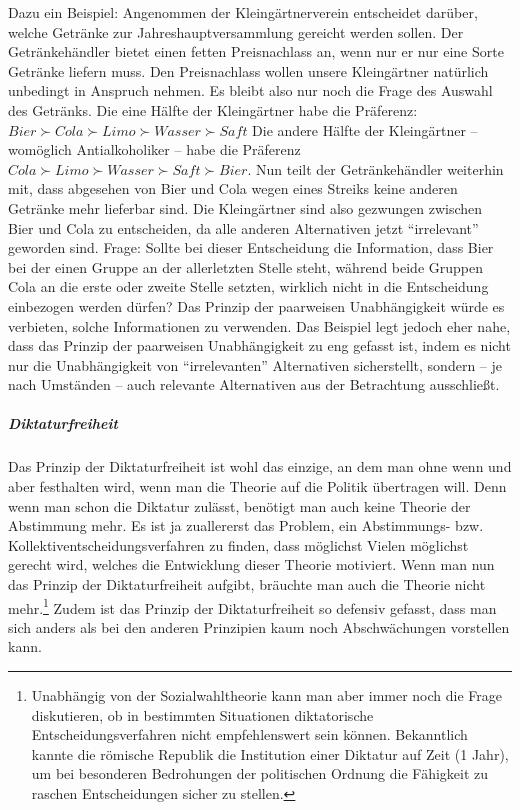 Dazu ein Beispiel: Angenommen der Kleingärtnerverein entscheidet darüber, welche
Getränke zur Jahreshauptversammlung gereicht werden sollen. Der Getränkehändler
bietet einen fetten Preisnachlass an, wenn nur er nur eine Sorte Getränke liefern
muss. Den Preisnachlass wollen unsere Kleingärtner natürlich unbedingt in
Anspruch nehmen. Es bleibt also nur noch die Frage des Auswahl des Getränks. Die
eine Hälfte der Kleingärtner habe die Präferenz: $Bier \succ Cola \succ Limo
\succ Wasser \succ Saft$ Die andere Hälfte der Kleingärtner -- womöglich
Antialkoholiker -- habe die Präferenz $Cola \succ Limo \succ Wasser \succ Saft
\succ Bier$. Nun teilt der Getränkehändler weiterhin mit, dass abgesehen von
Bier und Cola wegen eines Streiks keine anderen Getränke mehr lieferbar sind.
Die Kleingärtner sind also gezwungen zwischen Bier und Cola zu entscheiden, da
alle anderen Alternativen jetzt "`irrelevant"' geworden sind. Frage: Sollte bei
dieser Entscheidung die Information, dass Bier bei der einen Gruppe an der
allerletzten Stelle steht, während beide Gruppen Cola an die erste oder zweite
Stelle setzten, wirklich nicht in die Entscheidung einbezogen werden dürfen?
Das Prinzip der paarweisen Unabhängigkeit würde es verbieten, solche
Informationen zu verwenden. Das Beispiel legt jedoch eher nahe, dass das
Prinzip der paarweisen Unabhängigkeit zu eng gefasst ist, indem es nicht nur
die Unabhängigkeit von "`irrelevanten"' Alternativen sicherstellt, sondern --
je nach Umständen -- auch relevante Alternativen aus der Betrachtung
ausschließt.

\subparagraph{Diktaturfreiheit}

Das Prinzip der Diktaturfreiheit ist wohl das einzige, an dem man ohne wenn und
aber festhalten wird, wenn man die Theorie auf die Politik übertragen will. Denn
wenn man schon die Diktatur zulässt, benötigt man auch keine Theorie der
Abstimmung mehr. Es ist ja zuallererst das Problem, ein Abstimmungs- bzw.
Kollektiventscheidungsverfahren zu finden, dass möglichst Vielen möglichst
gerecht wird, welches die Entwicklung dieser Theorie motiviert. Wenn man nun das
Prinzip der Diktaturfreiheit aufgibt, bräuchte man auch die Theorie nicht
mehr.\footnote{Unabhängig von der Sozialwahltheorie kann man aber immer noch die
Frage diskutieren, ob in bestimmten Situationen diktatorische
Entscheidungsverfahren nicht empfehlenswert sein können. Bekanntlich kannte die
römische Republik die Institution einer Diktatur auf Zeit (1 Jahr), um bei
besonderen Bedrohungen der politischen Ordnung die Fähigkeit zu raschen
Entscheidungen sicher zu stellen.} Zudem ist das Prinzip der Diktaturfreiheit so
defensiv gefasst, dass man sich anders als bei den anderen Prinzipien kaum noch
Abschwächungen vorstellen kann.

